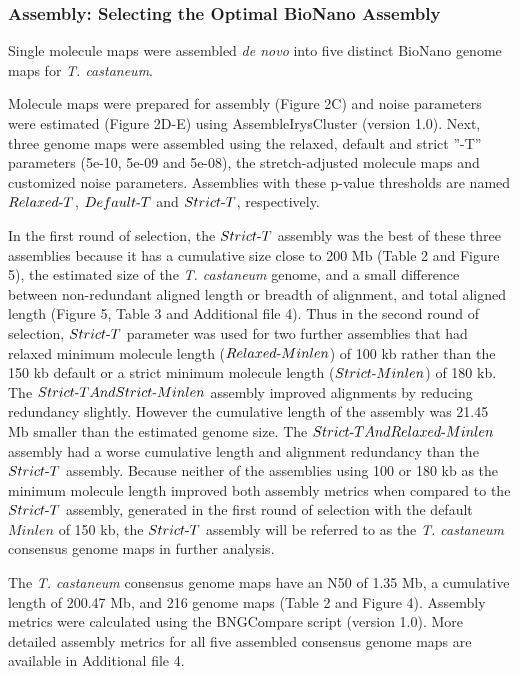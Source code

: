 \documentclass{bmcart}
\begin{document}
\subsubsection*{Assembly: Selecting the Optimal BioNano Assembly}
Single molecule maps were assembled \textit{de novo} into five distinct BioNano genome maps for \textit{T. castaneum}. 

Molecule maps were prepared for assembly (Figure 2C) and noise parameters were estimated (Figure 2D-E) using AssembleIrysCluster (version 1.0). Next, three genome maps were assembled using the relaxed, default and strict ”-T” parameters (5e-10, 5e-09 and 5e-08), the stretch-adjusted molecule maps and customized noise parameters. Assemblies with these p-value thresholds are named $Relaxed\textnormal{-}T$, $Default\textnormal{-}T$ and $Strict\textnormal{-}T$, respectively. 

In the first round of selection, the $Strict\textnormal{-}T$ assembly was the best of these three assemblies because it has a cumulative size close to 200 Mb (Table 2 and Figure 5), the estimated size of the \textit{T. castaneum} genome, and a small difference between non-redundant aligned length or breadth of alignment, and total aligned length (Figure 5, Table 3 and Additional file 4). Thus in the second round of selection, $Strict\textnormal{-}T$ parameter was used for two further assemblies that had relaxed minimum molecule length ($Relaxed\textnormal{-}Minlen$) of 100 kb rather than the 150 kb default or a strict minimum molecule length ($Strict\textnormal{-}Minlen$) of 180 kb. The $Strict\textnormal{-}TAndStrict\textnormal{-}Minlen$ assembly improved alignments by reducing redundancy slightly. However the cumulative length of the assembly was 21.45 Mb smaller than the estimated genome size. The $Strict\textnormal{-}TAndRelaxed\textnormal{-}Minlen$ assembly had a worse cumulative length and alignment redundancy than the $Strict\textnormal{-}T$ assembly. Because neither of the assemblies using 100 or 180 kb as the minimum molecule length improved both assembly metrics when compared to the $Strict\textnormal{-}T$ assembly, generated in the first round of selection with the default $Minlen$ of 150 kb, the $Strict\textnormal{-}T$ assembly will be referred to as the \textit{T. castaneum} consensus genome maps in further analysis.

The \textit{T. castaneum} consensus genome maps have an N50 of 1.35 Mb, a cumulative length of 200.47 Mb, and 216 genome maps (Table 2 and Figure 4). Assembly metrics were calculated using the BNGCompare script (version 1.0). More detailed assembly metrics for all five assembled consensus genome maps are available in Additional file 4.
\end{document}
